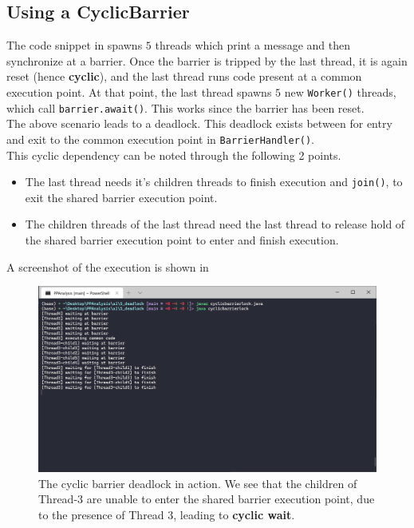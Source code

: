 \documentclass{article}
\begin{document}
    \subsection{Using a CyclicBarrier}
      The code snippet in  spawns $5$ threads which print a message and then synchronize at a barrier. Once the barrier is tripped by the last thread, it is again reset (hence \textbf{cyclic}), and the last thread runs code present at a common execution point. At that point, the last thread spawns $5$ new \lstinline!Worker()!  threads, which call \lstinline!barrier.await()!. This works since the barrier has been reset. \\
      The above scenario leads to a deadlock. This deadlock exists between for entry and exit to the common execution point in \lstinline!BarrierHandler()!.\\
      This cyclic dependency can be noted through the following 2 points.
      \begin{itemize}
        \item The last thread needs it's children threads to finish execution and \lstinline!join()!, to exit the shared barrier execution point.
        \item The children threads of the last thread need the last thread to release hold of the shared barrier execution point to enter and finish execution.
      \end{itemize}
      A screenshot of the execution is shown in 
      
      

      \begin{figure}[ht]
        \centering
        \includegraphics[scale=0.75]{5_deadlock/cyclic_barrier_deadlock.png}
        \caption{The cyclic barrier deadlock in action. We see that the children of Thread-3 are unable to enter the shared barrier execution point, due to the presence of Thread 3, leading to \textbf{cyclic wait}.}
        \label{fig::52}
      \end{figure}
\end{document}
